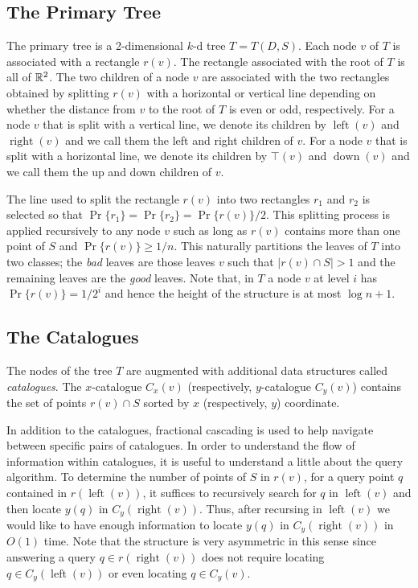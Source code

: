 \documentclass[lotsofwhite,charterfonts]{patmorin}
\DeclareMathOperator{\lft}{left}
\DeclareMathOperator{\rght}{right}
\DeclareMathOperator{\bttm}{down}
\begin{document}
\subsection{The Primary Tree}

The primary tree is a 2-dimensional $k$-d tree \cite{X} $T=T(D,S)$.
Each node $v$ of $T$ is associated with a rectangle $r(v)$.  The
rectangle associated with the root of $T$ is all of $\mathbb{R}^2$. The two
children of a node $v$ are associated with the two rectangles obtained
by splitting $r(v)$ with a horizontal or vertical line depending on
whether the distance from $v$ to the root of $T$ is even or odd,
respectively.  For a node $v$ that is split with a vertical line, we
denote its children by $\lft(v)$ and $\rght(v)$ and we call them the
left and right children of $v$.  For a node $v$ that is split with a
horizontal line, we denote its children by $\top(v)$ and $\bttm(v)$
and we call them the up and down children of $v$. 

The line used to split the rectangle $r(v)$ into two rectangles $r_1$
and $r_2$ is selected so that $\Pr\{r_1\}=\Pr\{r_2\}=\Pr\{r(v)\}/2$.
This splitting process is applied recursively to any node $v$ such as
long as $r(v)$ contains more than one point of $S$ and $\Pr\{r(v)\}
\ge 1/n$.  This naturally partitions the leaves of $T$ into two
classes; the \emph{bad} leaves are those leaves $v$ such that
$|r(v)\cap S| > 1$ and the remaining leaves are the \emph{good}
leaves.  Note that, in $T$ a node $v$ at level $i$ has
$\Pr\{r(v)\}=1/2^i$ and hence the height of the structure is at most
$\log n+1$.


\subsection{The Catalogues}

The nodes of the tree $T$ are augmented with additional data
structures called \emph{catalogues}.  The $x$-catalogue $C_x(v)$
(respectively, $y$-catalogue $C_y(v)$) contains the set of points
$r(v)\cap S$ sorted by $x$ (respectively, $y$) coordinate.

In addition to the catalogues, fractional cascading \cite{X} is used
to help navigate between specific pairs of catalogues.  In order to
understand the flow of information within catalogues, it is useful to
understand a little about the query algorithm.  To determine the
number of points of $S$ in $r(v)$, for a query point $q$ contained in
$r(\lft(v))$, it suffices to recursively search for $q$ in $\lft(v)$
and then locate $y(q)$ in $C_y(\rght(v))$.  Thus, after recursing in
$\lft(v)$ we would like to have enough information to locate $y(q)$ in
$C_y(\rght(v))$ in $O(1)$ time.  Note that the structure is very
asymmetric in this sense since answering a query $q\in r(\rght(v))$
does not require locating $q\in C_y(\lft(v))$ or even locating $q\in
C_y(v)$.
\end{document}
